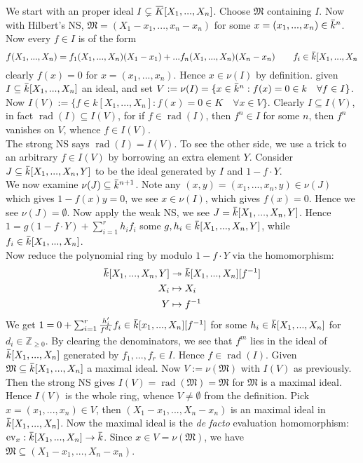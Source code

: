 \documentclass[12pt]{article}
\theoremstyle{definition}
\theoremstyle{plain}
\DeclareMathOperator{\rad}{rad}
\DeclareMathOperator{\ev}{ev}
\newcommand{\z}{\mathbb{Z}}
\newcommand{\surj}{\twoheadrightarrow}
\newcommand{\overbar}[1]{\mkern 1.5mu\overline{\mkern-1.5mu#1\mkern-1.5mu}\mkern 1.5mu}
\renewcommand{\bar}{\overbar}
\begin{document}
\medskip
{} We start with an proper ideal $I\subsetneq \bar{K}[X_1,..., X_n]$. Choose $\mathfrak{M}$ containing $I$. Now with Hilbert's NS, $\mathfrak{M}=(X_1-x_1, ..., x_n-x_n)$ for some $x=(x_1, ..., x_n)\in \bar{k}^n$. Now every $f\in I$ is of the form
\[f(X_1, ..., X_n)=f_1(X_1, ..., X_n)(X_1-x_1)+...f_n(X_1, ..., X_n)(X_n-x_n) \qquad f_i\in \bar{k}[X_1,..., X_n\]
clearly $f(x)=0$ for $x=(x_1, ..., x_n)$. Hence $x\in \nu(I)$ by definition.\qedhere
{} given $I\subseteq \bar{k}[X_1, ..., X_n]$ an ideal, and set $V:=\nu(I)=\{x\in \bar{k}^n:f(x)=0\in k \quad \forall f\in I\}$. Now $I(V):=\{f\in k[X_1, ..., X_n]:f(x)=0\in K \quad \forall x\in V\}$. Clearly $I\subseteq I(V)$, in fact $\rad(I)\subseteq I(V)$, for if $f\in \rad(I)$, then $f^n\in I$ for some $n$, then $f^n$ vanishes on $V$, whence $f\in I(V)$.\\
The strong NS says $\rad(I)=I(V)$. To see the other side, we use a trick to an arbitrary $f\in I(V)$ by borrowing an extra element $Y$. Consider $J\subseteq \bar{k}[X_1, ..., X_n, Y]$ to be the ideal generated by $I$ and $1-f\cdot Y$.\\
\indent We now examine $\nu(J)\subseteq \bar{k}^{n+1}$. Note any $(x, y)=(x_1, ..., x_n, y)\in \nu(J)$ which gives $1-f(x)y=0$, we see $x\in \nu(I)$, which gives $f(x)=0$. Hence we see $\nu(J)=\emptyset$. Now apply the weak NS, we see $J=\bar{k}[X_1, ..., X_n, Y]$. Hence $1=g(1-f\cdot Y)+\sum_{i=1}^rh_if_i$ some $g, h_i\in \bar{k}[X_1, ..., X_n, Y]$, while $f_i\in \bar{k}[X_1, ..., X_n]$.\\
\indent Now reduce the polynomial ring by modulo $1-f\cdot Y$ via the homomorphism:
\begin{align*}
  \bar{k}[X_1, ..., X_n, Y]&\surj \bar{k}[X_1, ..., X_n][f^{-1}]\\
  X_i&\mapsto X_i\\
  Y &\mapsto f^{-1}
\end{align*}
We get $1=0+\sum_{i=1}^r \frac{h_i'}{f^{d_i}}f_i\in \bar{k}[x_1, ..., X_n][f^{-1}]$ for some $h_i\in \bar{k}[X_1, ..., X_n]$ for $d_i\in \z_{\geq 0}$. By clearing the denominators, we see that $f^m$ lies in the ideal of $\bar{k}[X_1, ..., X_n]$ generated by $f_1, ..., f_r\in I$. Hence $f\in \rad(I)$.\qedhere
{} Given $\mathfrak{M}\subseteq \bar{k}[X_1, ..., X_n]$ a maximal ideal. Now $V:=\nu(\mathfrak{M})$ with $I(V)$ as previously. Then the strong NS gives $I(V)=\rad(\mathfrak{M})=\mathfrak{M}$ for $\mathfrak{M}$ is a maximal ideal. Hence $I(V)$ is the whole ring, whence $V\neq \emptyset$ from the definition. Pick $x=(x_1, ..., x_n)\in V$, then $(X_1-x_1, ..., X_n-x_n)$ is an maximal ideal in $\bar{k}[X_1, ..., X_n]$. Now the maximal ideal is the \textit{de facto} evaluation homomorphism: $\ev_x: \bar{k}[X_1, ..., X_n]\to \bar{k}$. Since $x\in V=\nu(\mathfrak{M})$, we have $\mathfrak{M}\subseteq (X_1-x_1, ..., X_n-x_n)$.\qedhere
\end{document}
